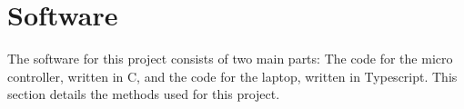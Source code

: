 \section{Software}
\label{sec:software}

The software for this project consists of two main parts: 
The code for the micro controller, written in C, and the code for the laptop, written in Typescript.
This section details the methods used for this project.